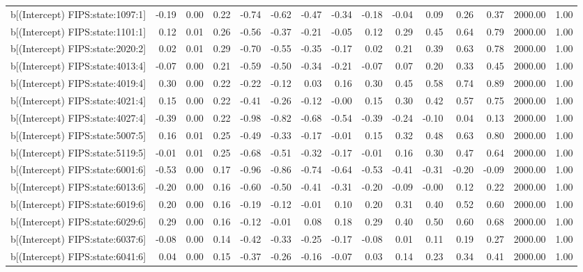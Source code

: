 \begin{table}[ht]
\begin{tabular}{rrrrrrrrrrrrrrr}
  b[(Intercept) FIPS:state:1097:1] & -0.19 & 0.00 & 0.22 & -0.74 & -0.62 & -0.47 & -0.34 & -0.18 & -0.04 & 0.09 & 0.26 & 0.37 & 2000.00 & 1.00 \\ 
  b[(Intercept) FIPS:state:1101:1] & 0.12 & 0.01 & 0.26 & -0.56 & -0.37 & -0.21 & -0.05 & 0.12 & 0.29 & 0.45 & 0.64 & 0.79 & 2000.00 & 1.00 \\ 
  b[(Intercept) FIPS:state:2020:2] & 0.02 & 0.01 & 0.29 & -0.70 & -0.55 & -0.35 & -0.17 & 0.02 & 0.21 & 0.39 & 0.63 & 0.78 & 2000.00 & 1.00 \\ 
  b[(Intercept) FIPS:state:4013:4] & -0.07 & 0.00 & 0.21 & -0.59 & -0.50 & -0.34 & -0.21 & -0.07 & 0.07 & 0.20 & 0.33 & 0.45 & 2000.00 & 1.00 \\ 
  b[(Intercept) FIPS:state:4019:4] & 0.30 & 0.00 & 0.22 & -0.22 & -0.12 & 0.03 & 0.16 & 0.30 & 0.45 & 0.58 & 0.74 & 0.89 & 2000.00 & 1.00 \\ 
  b[(Intercept) FIPS:state:4021:4] & 0.15 & 0.00 & 0.22 & -0.41 & -0.26 & -0.12 & -0.00 & 0.15 & 0.30 & 0.42 & 0.57 & 0.75 & 2000.00 & 1.00 \\ 
  b[(Intercept) FIPS:state:4027:4] & -0.39 & 0.00 & 0.22 & -0.98 & -0.82 & -0.68 & -0.54 & -0.39 & -0.24 & -0.10 & 0.04 & 0.13 & 2000.00 & 1.00 \\ 
  b[(Intercept) FIPS:state:5007:5] & 0.16 & 0.01 & 0.25 & -0.49 & -0.33 & -0.17 & -0.01 & 0.15 & 0.32 & 0.48 & 0.63 & 0.80 & 2000.00 & 1.00 \\ 
  b[(Intercept) FIPS:state:5119:5] & -0.01 & 0.01 & 0.25 & -0.68 & -0.51 & -0.32 & -0.17 & -0.01 & 0.16 & 0.30 & 0.47 & 0.64 & 2000.00 & 1.00 \\ 
  b[(Intercept) FIPS:state:6001:6] & -0.53 & 0.00 & 0.17 & -0.96 & -0.86 & -0.74 & -0.64 & -0.53 & -0.41 & -0.31 & -0.20 & -0.09 & 2000.00 & 1.00 \\ 
  b[(Intercept) FIPS:state:6013:6] & -0.20 & 0.00 & 0.16 & -0.60 & -0.50 & -0.41 & -0.31 & -0.20 & -0.09 & -0.00 & 0.12 & 0.22 & 2000.00 & 1.00 \\ 
  b[(Intercept) FIPS:state:6019:6] & 0.20 & 0.00 & 0.16 & -0.19 & -0.12 & -0.01 & 0.10 & 0.20 & 0.31 & 0.40 & 0.52 & 0.60 & 2000.00 & 1.00 \\ 
  b[(Intercept) FIPS:state:6029:6] & 0.29 & 0.00 & 0.16 & -0.12 & -0.01 & 0.08 & 0.18 & 0.29 & 0.40 & 0.50 & 0.60 & 0.68 & 2000.00 & 1.00 \\ 
  b[(Intercept) FIPS:state:6037:6] & -0.08 & 0.00 & 0.14 & -0.42 & -0.33 & -0.25 & -0.17 & -0.08 & 0.01 & 0.11 & 0.19 & 0.27 & 2000.00 & 1.00 \\ 
  b[(Intercept) FIPS:state:6041:6] & 0.04 & 0.00 & 0.15 & -0.37 & -0.26 & -0.16 & -0.07 & 0.03 & 0.14 & 0.23 & 0.34 & 0.41 & 2000.00 & 1.00 \\ 

\end{tabular}
\end{table}

